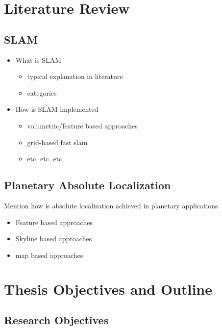 \section{Literature Review}

\subsection{SLAM}

\begin{itemize}
    \item  What is SLAM
        \begin{itemize}
            \item typical explanation in literature
            \item categories
        \end{itemize}
    \item How is SLAM implemented
        \begin{itemize}
            \item volumetric/feature based approaches
            \item grid-based fast slam
            \item etc. etc. etc.
        \end{itemize}
\end{itemize}

\subsection{Planetary Absolute Localization}

Mention how is absolute localization achieved in planetary applications

\begin{itemize}
    \item Feature based approaches
    \item Skyline based approaches
    \item map based approaches
\end{itemize}

\section{Thesis Objectives and Outline}

\subsection{Research Objectives}

